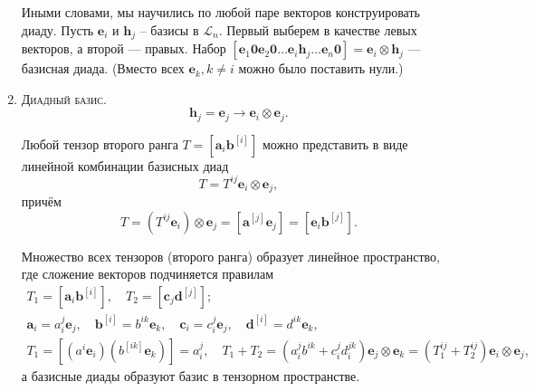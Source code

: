\begin{definition}[геометрическое]
\begin{enumerate}
    Иными словами, мы научились по любой паре векторов конструировать диаду. Пусть $\mathbf{e}_i$ и
    $\mathbf{h}_j$ -- базисы в $\mathcal{L}_n$. Первый выберем в качестве левых векторов, а
    второй --- правых. Набор $[\mathbf{e}_1 \mathbf{0} \mathbf{e}_2 \mathbf{0}
    \dots \mathbf{e}_i \mathbf{h}_j \dots \mathbf{e}_n \mathbf{0}] =
    \mathbf{e}_i \otimes \mathbf{h}_j$ --- базисная диада. (Вместо всех
    $\mathbf{e}_k, k\neq i$ можно было поставить нули.) 

  \item \textsc{Диадный базис.} %
  	\begin{equation*}
  		\mathbf{h}_j = \mathbf{e}_j \longrightarrow \mathbf{e}_i \otimes
      \mathbf{e}_j.
  	\end{equation*}
  
    \begin{theorem}
      Любой тензор второго ранга $ T = [\mathbf{a}_i \mathbf{b}^{[i]}]$ можно представить в виде линейной комбинации базисных диад
      \begin{equation}\label{lec_2:eq:tensor_basis}
        T = T^{ij} \mathbf{e}_i \otimes \mathbf{e}_j,
      \end{equation}
       причём
      \[
        T = (T^{ij} \mathbf{e}_i) \otimes \mathbf{e}_j
        = [\mathbf{a}^{[j]} \mathbf{e}_j]
        = [\mathbf{e}_i \mathbf{b}^{[j]}].
      \]
    \end{theorem}
    \begin{corollary*}
      Множество всех тензоров (второго ранга) образует линейное пространство,
      где сложение векторов подчиняется правилам
      \begin{gather*}
        T_1 = [\mathbf{a}_i \mathbf{b}^{[i]}], \quad
        T_2 = [\mathbf{c}_j \mathbf{d}^{[j]}]; \\
        \mathbf{a}_i = a^j_i \mathbf{e}_j, \quad
        \mathbf{b}^{[i]} = b^{ik} \mathbf{e}_k,\quad
        \mathbf{c}_i = c^{j}_{i} \mathbf{e}_j, \quad
        \mathbf{d}^{[i]} = d^{ik} \mathbf{e}_k,  \\
        T_1 = [(a^i \mathbf{e}_i) (b^{[ik]} \mathbf{e}_k)] = a^j_i, \quad
        T_1 + T_2 = (a^j_i b^{ik} + c^{j}_i d^{jk}_i) \mathbf{e}_j \otimes \mathbf{e}_k
        = (T_1^{ij} + T_2^{ij}) \mathbf{e}_i \otimes \mathbf{e}_j,
      \end{gather*}
      а базисные диады образуют базис в тензорном пространстве.
    \end{corollary*}
  \end{enumerate}
\end{definition}
\renewcommand{\thedefinition}{\arabic{definition}}

